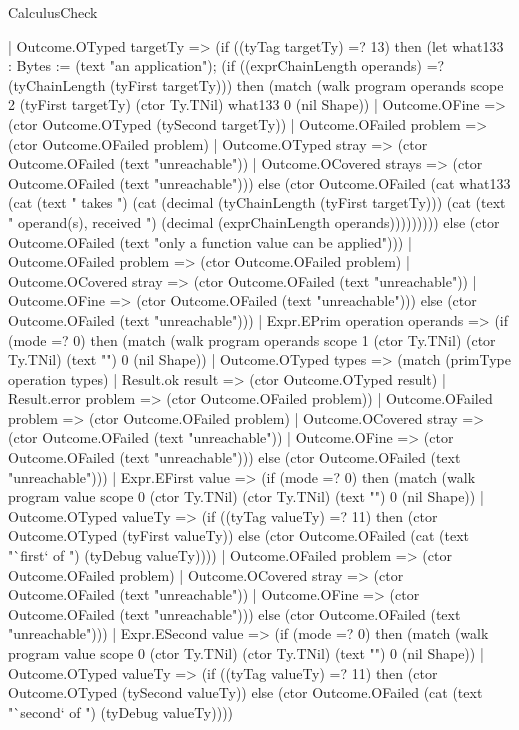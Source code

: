 \begin{lexlean}{CalculusCheck}
\begin{semanticmodule}
{      | Outcome.OTyped targetTy => (if ((tyTag targetTy) =? 13) then (let what133 : Bytes := (text "an application"); (if ((exprChainLength operands) =? (tyChainLength (tyFirst targetTy))) then (match (walk program operands scope 2 (tyFirst targetTy) (ctor Ty.TNil) what133 0 (nil Shape))
        | Outcome.OFine => (ctor Outcome.OTyped (tySecond targetTy))
        | Outcome.OFailed problem => (ctor Outcome.OFailed problem)
        | Outcome.OTyped stray => (ctor Outcome.OFailed (text "unreachable"))
        | Outcome.OCovered strays => (ctor Outcome.OFailed (text "unreachable"))) else (ctor Outcome.OFailed (cat what133 (cat (text " takes ") (cat (decimal (tyChainLength (tyFirst targetTy))) (cat (text " operand(s), received ") (decimal (exprChainLength operands))))))))) else (ctor Outcome.OFailed (text "only a function value can be applied")))
      | Outcome.OFailed problem => (ctor Outcome.OFailed problem)
      | Outcome.OCovered stray => (ctor Outcome.OFailed (text "unreachable"))
      | Outcome.OFine => (ctor Outcome.OFailed (text "unreachable"))) else (ctor Outcome.OFailed (text "unreachable")))
    | Expr.EPrim operation operands => (if (mode =? 0) then (match (walk program operands scope 1 (ctor Ty.TNil) (ctor Ty.TNil) (text "") 0 (nil Shape))
      | Outcome.OTyped types => (match (primType operation types)
        | Result.ok result => (ctor Outcome.OTyped result)
        | Result.error problem => (ctor Outcome.OFailed problem))
      | Outcome.OFailed problem => (ctor Outcome.OFailed problem)
      | Outcome.OCovered stray => (ctor Outcome.OFailed (text "unreachable"))
      | Outcome.OFine => (ctor Outcome.OFailed (text "unreachable"))) else (ctor Outcome.OFailed (text "unreachable")))
    | Expr.EFirst value => (if (mode =? 0) then (match (walk program value scope 0 (ctor Ty.TNil) (ctor Ty.TNil) (text "") 0 (nil Shape))
      | Outcome.OTyped valueTy => (if ((tyTag valueTy) =? 11) then (ctor Outcome.OTyped (tyFirst valueTy)) else (ctor Outcome.OFailed (cat (text "`first` of ") (tyDebug valueTy))))
      | Outcome.OFailed problem => (ctor Outcome.OFailed problem)
      | Outcome.OCovered stray => (ctor Outcome.OFailed (text "unreachable"))
      | Outcome.OFine => (ctor Outcome.OFailed (text "unreachable"))) else (ctor Outcome.OFailed (text "unreachable")))
    | Expr.ESecond value => (if (mode =? 0) then (match (walk program value scope 0 (ctor Ty.TNil) (ctor Ty.TNil) (text "") 0 (nil Shape))
      | Outcome.OTyped valueTy => (if ((tyTag valueTy) =? 11) then (ctor Outcome.OTyped (tySecond valueTy)) else (ctor Outcome.OFailed (cat (text "`second` of ") (tyDebug valueTy))))
}
\end{semanticmodule}
\end{lexlean}

